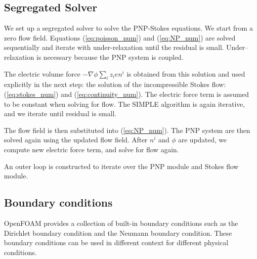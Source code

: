 \subsection{Segregated Solver}
We set up a segregated solver to solve the PNP-Stokes equations. We start from a zero flow field. Equations  (\ref{eq:poisson_num}) and (\ref{eq:NP_num}) are solved sequentially and iterate with under-relaxation until the residual is small. Under--relaxation is necessary because the PNP system is coupled. 

The electric volume force $- \nabla \phi\sum_i z_ien^i $ is obtained from this solution and used explicitly in the next step: the solution of the incompressible Stokes flow: (\ref{eq:stokes_num}) and (\ref{eq:continuity_num}). The electric force term is assumed to be constant when solving for flow. The SIMPLE algorithm is again iterative, and we iterate until residual is small.

The flow field is then substituted into (\ref{eq:NP_num}). The PNP system are then solved again using the updated flow field. After $n^i$ and $\phi$ are updated, we compute new electric force term, and solve for flow again.

An outer loop is constructed to iterate over the PNP module and Stokes flow module.

\subsection{Boundary conditions}
OpenFOAM provides a collection of built-in boundary conditions such as the Dirichlet boundary condition and the Neumann boundary condition. These boundary conditions can be used in different context for different physical conditions.

